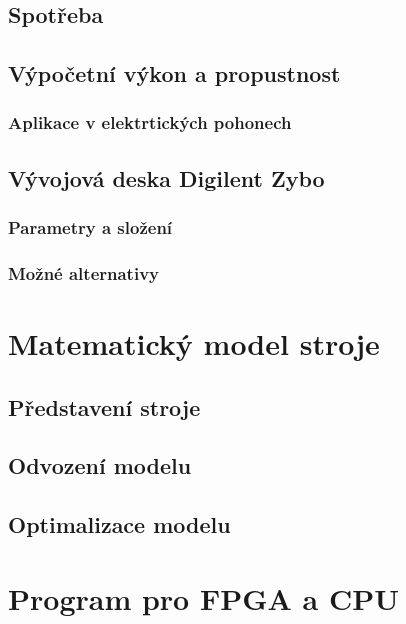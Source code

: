 \documentclass[a4paper, twoside, 11pt]{article}
\begin{document}
			\subsection{Spotřeba}
			\subsection{Výpočetní výkon a propustnost}
			\subsubsection{Aplikace v elektrtických pohonech}
	\subsection{Vývojová deska Digilent Zybo}
		\subsubsection{Parametry a složení}
		\subsubsection{Možné alternativy}

\section{Matematický model stroje}
	\subsection{Představení stroje}
	\subsection{Odvození modelu}
	\subsection{Optimalizace modelu}

\section{Program pro FPGA a CPU}
\end{document}
